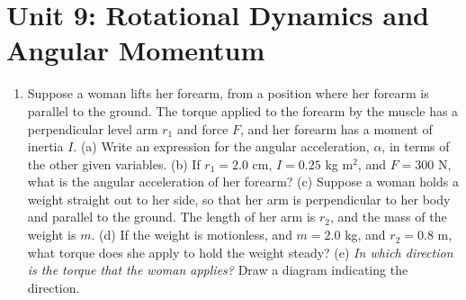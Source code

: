\documentclass[10pt]{article}
\begin{document}
\section{Unit 9: Rotational Dynamics and Angular Momentum}
\begin{enumerate}
\item Suppose a woman lifts her forearm, from a position where her forearm is parallel to the ground.  The torque applied to the forearm by the muscle has a perpendicular level arm $r_1$ and force $F$, and her forearm has a moment of inertia $I$.  (a) Write an expression for the angular acceleration, $\alpha$, in terms of the other given variables.  (b) If $r_1 = 2.0$ cm, $I = 0.25$ kg m$^2$, and $F = 300$ N, what is the angular acceleration of her forearm?  (c) Suppose a woman holds a weight straight out to her side, so that her arm is perpendicular to her body and parallel to the ground.  The length of her arm is $r_2$, and the mass of the weight is $m$.  (d) If the weight is motionless, and $m = 2.0$ kg, and $r_2 = 0.8$ m, what torque does she apply to hold the weight steady?  (e) \textit{In which direction is the torque that the woman applies?}  Draw a diagram indicating the direction.
\end{enumerate}
\end{document}
